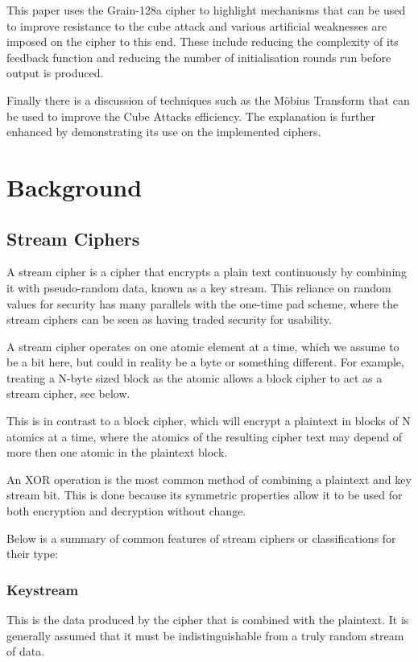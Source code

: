 \documentclass{report}
\let\Oldsection\section
\renewcommand{\section}{\FloatBarrier\Oldsection}
\let\Oldsubsection\subsection
\renewcommand{\subsection}{\FloatBarrier\Oldsubsection}
\begin{document}
This paper uses the Grain-128a cipher to highlight mechanisms that can be used to improve resistance to the cube attack and various artificial weaknesses are imposed on the cipher to this end. These include reducing the complexity of its feedback function and reducing the number of initialisation rounds run before output is produced.

Finally there is a discussion of techniques such as the Möbius Transform that can be used to improve the Cube Attacks efficiency. The explanation is further enhanced by demonstrating its use on the implemented ciphers.

\chapter{Background}
\section{Stream Ciphers}
A stream cipher is a cipher that encrypts a plain text continuously by combining it with pseudo-random data, known as a key stream. This reliance on random values for security has many parallels with the one-time pad scheme, where the stream ciphers can be seen as having traded security for usability.

A stream cipher operates on one atomic element at a time, which we assume to be a bit here, but could in reality be a byte or something different. For example, treating a N-byte sized block as the atomic allows a block cipher to act as a stream cipher, see below.

This is in contrast to a block cipher, which will encrypt a plaintext in blocks of N atomics at a time, where the atomics of the resulting cipher text may depend of more then one atomic in the plaintext block.

An XOR operation is the most common method of combining a plaintext and key stream bit. This is done because its symmetric properties allow it to be used for both encryption and decryption without change.

Below is a summary of common features of stream ciphers or classifications for their type:

\subsection{Keystream}
This is the data produced by the cipher that is combined with the plaintext. It is generally assumed that it must be indistinguishable from a truly random stream of data.
\end{document}
